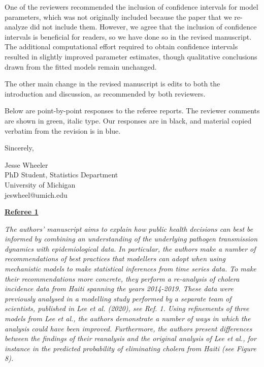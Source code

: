 \documentclass[11pt]{article}
\newcommand\report[1]{{\color{mygreen} \vspace{1mm}\hspace{0.25in}\parbox{6in}{\em #1}}}
\begin{document}
One of the reviewers recommended the inclusion of confidence intervals for model parameters, which was not originally included because the paper that we re-analyze did not include them. 
However, we agree that the inclusion of confidence intervals is beneficial for readers, so we have done so in the revised manuscript.
The additional computational effort required to obtain confidence intervals resulted in slightly improved parameter estimates, though qualitative conclusions drawn from the fitted models remain unchanged. 

The other main change in the revised manuscript is edits to both the introduction and discussion, as recommended by both reviewers.

Below are point-by-point responses to the referee reports.
The reviewer comments are shown in green, italic type.
Our responses are in black, and material copied verbatim from the revision is in blue.


\vspace{3mm}

Sincerely,




Jesse Wheeler \\
PhD Student, Statistics Department \\
University of Michigan\\
jeswheel@umich.edu

\vspace{5mm}

\newpage


\begin{center}
{\large{\textbf{\underline{Referee 1}}}} %
\end{center}

\report{
  The authors' manuscript aims to explain how public health decisions can best be informed by combining an understanding of the underlying pathogen transmission dynamics with epidemiological data. In particular, the authors make a number of recommendations of best practices that modellers can adopt when using mechanistic models to make statistical inferences from time series data. To make their recommendations more concrete, they perform a re-analysis of cholera incidence data from Haiti spanning the years 2014-2019. These data were previously analysed in a modelling study performed by a separate team of scientists, published in Lee et al. (2020), see Ref. 1. Using refinements of three models from Lee et al., the authors demonstrate a number of ways in which the analysis could have been improved. Furthermore, the authors present differences between the findings of their reanalysis and the original analysis of Lee et al., for instance in the predicted probability of eliminating cholera from Haiti (see Figure 8).
}
\end{document}
